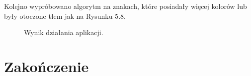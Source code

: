 \documentclass[eng,oneside]{mgr}
\begin{document}
\par Kolejno wypróbowano algorytm na znakach, które posiadały więcej kolorów lub były otoczone tłem jak na Rysunku 5.8.
\begin{figure}[htbp]
\centering
{}
\quad
{}
\caption{Wynik działania aplikacji.}
\end{figure}

\chapter{Zakończenie}
\end{document}
